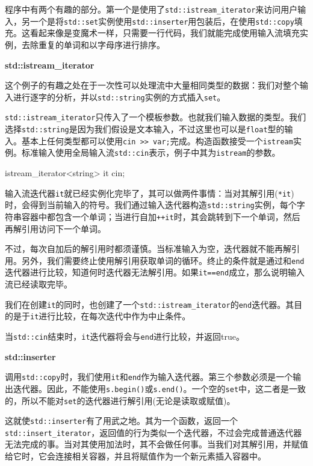 
程序中有两个有趣的部分。第一个是使用了\texttt{std::istream\_iterator}来访问用户输入，另一个是将\texttt{std::set}实例使用\texttt{std::inserter}用包装后，在使用\texttt{std::copy}填充。这看起来像是变魔术一样，只需要一行代码，我们就能完成使用输入流填充实例，去除重复的单词和以字母序进行排序。

\textbf{std::istream\_iterator}

这个例子的有趣之处在于一次性可以处理流中大量相同类型的数据：我们对整个输入进行逐字的分析，并以\texttt{std::string}实例的方式插入\texttt{set}。

\texttt{std::istream\_iterator}只传入了一个模板参数。也就我们输入数据的类型。我们选择\texttt{std::string}是因为我们假设是文本输入，不过这里也可以是\texttt{float}型的输入。基本上任何类型都可以使用\texttt{cin >> var;}完成。构造函数接受一个\texttt{istream}实例。标准输入使用全局输入流\texttt{std::cin}表示，例子中其为\texttt{istream}的参数。

\begin{codebox}[cpp]
istream_iterator<string> it {cin};
\end{codebox}

输入流迭代器\texttt{it}就已经实例化完毕了，其可以做两件事情：当对其解引用(\texttt{*it})时，会得到当前输入的符号。我们通过输入迭代器构造\texttt{std::string}实例，每个字符串容器中都包含一个单词；当进行自加\texttt{++it}时，其会跳转到下一个单词，然后再解引用访问下一个单词。

不过，每次自加后的解引用时都须谨慎。当标准输入为空，迭代器就不能再解引用。另外，我们需要终止使用解引用获取单词的循环。终止的条件就是通过和\texttt{end}迭代器进行比较，知道何时迭代器无法解引用。如果\texttt{it==end}成立，那么说明输入流已经读取完毕。

我们在创建\texttt{it}的同时，也创建了一个\texttt{std::istream\_iterator}的\texttt{end}迭代器。其目的是于\texttt{it}进行比较，在每次迭代中作为中止条件。

当\texttt{std::cin}结束时，\texttt{it}迭代器将会与\texttt{end}进行比较，并返回true。

\textbf{std::inserter}

调用\texttt{std::copy}时，我们使用\texttt{it}和\texttt{end}作为输入迭代器。第三个参数必须是一个输出迭代器。因此，不能使用\texttt{s.begin()}或\texttt{s.end()}。一个空的\texttt{set}中，这二者是一致的，所以不能对\texttt{set}的迭代器进行解引用(无论是读取或赋值)。

这就使\texttt{std::inserter}有了用武之地。其为一个函数，返回一个\texttt{std::insert\_iterator}，返回值的行为类似一个迭代器，不过会完成普通迭代器无法完成的事。当对其使用加法时，其不会做任何事。当我们对其解引用，并赋值给它时，它会连接相关容器，并且将赋值作为一个新元素插入容器中。

